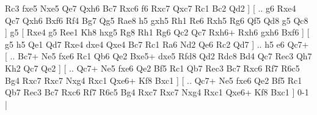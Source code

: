 Rc3 fxe5  Nxe5 Qe7  Qxh6 Bc7  Rxc6 f6  Rxc7 Qxc7  Rc1 Bc2  Qd2   ]  [ .. g6  Rxe4 Qc7  Qxh6 Bxf6  Rf4 Bg7  Qg5 Rae8  h5 gxh5  Rh1 Re6  Rxh5 Rg6  Qf5 Qd8  g5 Qc8   ]  g5 [  Rxe4 g5  Ree1 Kh8  hxg5 Rg8  Rh1 Rg6  Qc2 Qc7  Rxh6+ Rxh6  gxh6 Bxf6   ]  [  g5 h5  Qe1 Qd7  Rxe4 dxe4  Qxe4 Bc7  Rc1 Ra6  Nd2 Qe6  Rc2 Qd7   ] .. h5    e6   Qc7+ [ .. Bc7+  Ne5 fxe6  Rc1 Qb6  Qe2 Bxe5+  dxe5 Rfd8  Qd2 Rdc8  Bd4 Qc7  Rec3 Qh7  Kh2 Qc7  Qe2   ]  [ .. Qc7+  Ne5 fxe6  Qe2 Bf5  Rc1 Qb7  Rec3 Bc7  Rxc6 Rf7  R6c5 Bg4  Rxc7 Rxc7  Nxg4 Rxc1  Qxe6+ Kf8  Bxc1   ]  [ .. Qc7+  Ne5 fxe6  Qe2 Bf5  Rc1 Qb7  Rec3 Bc7  Rxc6 Rf7  R6c5 Bg4  Rxc7 Rxc7  Nxg4 Rxc1  Qxe6+ Kf8  Bxc1   ] 0-1  |
